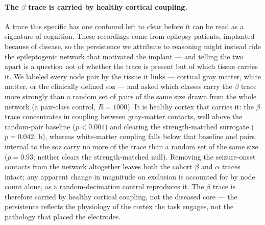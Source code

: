 \paragraph{The \(\beta\) trace is carried by healthy cortical coupling.}
A trace this specific has one confound left to clear before it can be read as a signature of cognition. These recordings come from epilepsy patients, implanted because of disease, so the persistence we attribute to reasoning might instead ride the epileptogenic network that motivated the implant --- and telling the two apart is a question not of whether the trace is present but of which tissue carries it. We labeled every node pair by the tissue it links --- cortical gray matter, white matter, or the clinically defined \gls{soz} --- and asked which classes carry the \(\beta\) trace more strongly than a random set of pairs of the same size drawn from the whole network (a pair-class control, \(R = 1000\)). It is healthy cortex that carries it: the \(\beta\) trace concentrates in coupling between gray-matter contacts, well above the random-pair baseline (\(p < 0.001\)) and clearing the strength-matched surrogate (\(p = 0.042\); b), whereas white-matter coupling falls below that baseline and pairs internal to the \gls{soz} carry no more of the trace than a random set of the same size (\(p = 0.93\); neither clears the strength-matched null). Removing the seizure-onset contacts from the network altogether leaves both the cohort \(\beta\) and \(\alpha\) traces intact; any apparent change in magnitude on exclusion is accounted for by node count alone, as a random-decimation control reproduces it. The \(\beta\) trace is therefore carried by healthy cortical coupling, not the diseased core --- the persistence reflects the physiology of the cortex the task engages, not the pathology that placed the electrodes.

